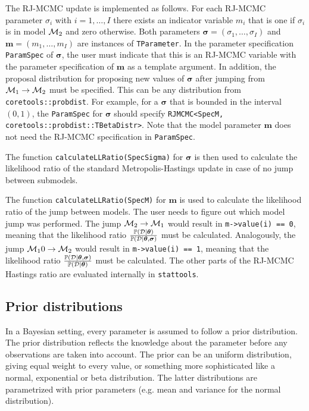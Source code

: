 \documentclass[a4paper,11pt]{article}
\def\m{\boldsymbol{m}}
\def\bsigma{\boldsymbol{\sigma}}
\def\btheta{\boldsymbol{\theta}}
\def\D{{\cal D}}
\def\cM{{\cal M}}
\def\p{\mathbb{P}}
\def\stattools{\texttt{stattools}}
\newcommand{\class}[1]{\texttt{#1}}
\newcommand{\type}[1]{\texttt{#1}}
\begin{document}
The RJ-MCMC update is implemented as follows. For each RJ-MCMC parameter $\sigma_i$ with $i = 1, \ldots, I$ there exists an indicator variable $m_i$ that is one if $\sigma_i$ is in model $\cM_2$ and zero otherwise. Both parameters $\bsigma = (\sigma_1, \ldots, \sigma_I)$ and $\m = (m_1, \ldots, m_I)$ are instances of \class{TParameter}. In the parameter specification \class{ParamSpec} of $\bsigma$, the user must indicate that this is an RJ-MCMC variable with the parameter specification of $\m$ as a template argument. In addition, the proposal distribution for proposing new values of $\bsigma$ after jumping from $\cM_1 \to \cM_2$ must be specified. This can be any distribution from \texttt{coretools::probdist}. For example, for a $\bsigma$ that is bounded in the interval $(0,1)$, the \type{ParamSpec} for $\bsigma$ should specify \type{RJMCMC<SpecM, coretools::probdist::TBetaDistr>}. Note that the model parameter $\m$ does not need the RJ-MCMC specification in \type{ParamSpec}.

The function \type{calculateLLRatio(SpecSigma)} for $\bsigma$ is then used to calculate the likelihood ratio of the standard Metropolis-Hastings update in case of no jump between submodels.

The function \type{calculateLLRatio(SpecM)} for $\m$ is used to calculate the likelihood ratio of the jump between models. The user needs to figure out which model jump was performed. The jump $\cM_2 \to \cM_1$ would result in \type{m->value(i) == 0}, meaning that the likelihood ratio $\frac{\p(\D|\btheta)}{\p(\D|\btheta, \bsigma)}$ must be calculated. Analogously, the jump $\cM_10 \to \cM_2$ would result in \type{m->value(i) == 1}, meaning that the likelihood ratio $\frac{\p(\D|\btheta, \bsigma)}{\p(\D|\btheta)}$ must be calculated. The other parts of the RJ-MCMC Hastings ratio are evaluated internally in \stattools{}.

\subsection{Prior distributions}
In a Bayesian setting, every parameter is assumed to follow a prior distribution. The prior distribution reflects the knowledge about the parameter before any observations are taken into account. The prior can be an uniform distribution, giving equal weight to every value, or something more sophisticated like a normal, exponential or beta distribution. The latter distributions are parametrized with prior parameters (e.g. mean and variance for the normal distribution).
\end{document}
